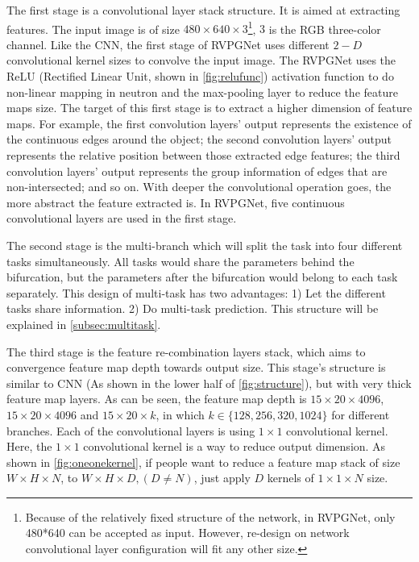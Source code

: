 \begin{spacing}{1.5}
The first stage is a convolutional layer stack structure. It is aimed at extracting features. The input image is of size $480 \times 640 \times 3$\footnote{Because of the relatively fixed structure of the network, in RVPGNet, only 480*640 can be accepted as input. However, re-design on network convolutional layer configuration will fit any other size.}, $3$ is the RGB three-color channel. Like the CNN, the first stage of RVPGNet uses different $2-D$ convolutional kernel sizes to convolve the input image. The RVPGNet uses the ReLU (Rectified Linear Unit, shown in \autoref{fig:relufunc}) activation function to do non-linear mapping in neutron and the max-pooling layer to reduce the feature maps size. The target of this first stage is to extract a higher dimension of feature maps. For example, the first convolution layers' output represents the existence of the continuous edges around the object; the second convolution layers' output represents the relative position between those extracted edge features; the third convolution layers' output represents the group information of edges that are non-intersected; and so on. With deeper the convolutional operation goes, the more abstract the feature extracted is. In RVPGNet, five continuous convolutional layers are used in the first stage.

The second stage is the multi-branch which will split the task into four different tasks simultaneously. All tasks would share the parameters behind the bifurcation, but the parameters after the bifurcation would belong to each task separately. This design of multi-task has two advantages: 1) Let the different tasks share information. 2) Do multi-task prediction. This structure will be explained in \autoref{subsec:multitask}.

The third stage is the feature re-combination layers stack, which aims to convergence feature map depth towards output size. This stage's structure is similar to CNN (As shown in the lower half of \autoref{fig:structure}), but with very thick feature map layers. As can be seen, the feature map depth is $15 \times 20 \times 4096$, $15 \times 20 \times 4096$ and $15 \times 20 \times k$, in which $k \in \{128, 256, 320, 1024\}$ for different branches. Each of the convolutional layers is using $1 \times 1$ convolutional kernel. Here, the $1 \times 1$ convolutional kernel is a way to reduce output dimension. As shown in \autoref{fig:oneonekernel}, if people want to reduce a feature map stack of size $W \times H \times N$, to $W \times H \times D, (D \neq N)$, just apply $D$ kernels of $1 \times 1 \times N$ size.


\end{spacing}
